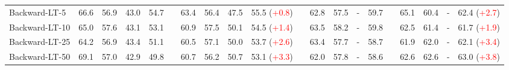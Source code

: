 \documentclass{article}
\def\red{\textcolor{red}}
\begin{document}
\begin{table*}[h]
\begin{center}
\begin{threeparttable}
{\begin{tabular}{lccccccccccccccccccc}
          Backward-LT-5 & 66.6 & 56.9 & 43.0 &  {54.7} && 63.4 & 56.4 &47.5 &  {55.5 (\red{+0.8})} && 62.8 & 57.5 &- &  {59.7} & & 65.1 & 60.4 & - &  {62.4 (\red{+2.7})}   \\
         Backward-LT-10    & 65.0      & 57.6 	& 43.1 &  {53.1} && 60.9      & 57.5	 	& 50.1 &  {54.5 (\red{+1.4})}   &&    63.5 & 58.2 & - &  {59.8}& &  62.5 & 61.4 & - &  {61.7 (\red{+1.9})}\\ 
           Backward-LT-25 &  64.2 & 56.9 & 43.4 &  {51.1} &&  60.5 & 57.1 & 50.0 &  {53.7 (\red{+2.6})} && 63.4 & 57.7 &- &  {58.7}& & 61.9 & 62.0 & - &  {62.1 (\red{+3.4})}\\
          Backward-LT-50 & 69.1       & 57.0	 	& 42.9 &	 {49.8} && 60.7      & 56.2	 	&  50.7 &  {53.1 (\red{+3.3})}   && 62.0 & 57.8 & - &  {58.6}& &  62.6 & 62.6 & - &  {63.0 (\red{+3.8})}\\
     

\end{tabular}}
\end{threeparttable}
\end{center}
\end{table*}
\end{document}
